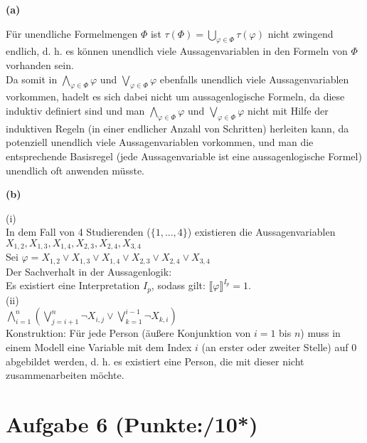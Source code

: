 \documentclass[11pt, a4paper]{article}
\newcommand{\pppp}{10*}
\begin{document}
\textbf{(a)}
\begin{adjustwidth}{20pt}{20pt}
Für unendliche Formelmengen $\Phi$ ist $\tau(\Phi)=\bigcup\limits_{\varphi \in \Phi} \tau(\varphi)$ nicht zwingend endlich, d. h. es können unendlich viele Aussagenvariablen in den Formeln von $\Phi$ vorhanden sein.\\

Da somit in $\bigwedge\limits_{\varphi \in \Phi} \varphi$ und $\bigvee\limits_{\varphi \in \Phi} \varphi$ ebenfalls unendlich viele Aussagenvariablen vorkommen, hadelt es sich dabei nicht um aussagenlogische Formeln, da diese induktiv definiert sind und man $\bigwedge\limits_{\varphi \in \Phi} \varphi$ und $\bigvee\limits_{\varphi \in \Phi} \varphi$ nicht mit Hilfe der induktiven Regeln (in einer endlicher Anzahl von Schritten) herleiten kann, da potenziell unendlich viele Aussagenvariablen vorkommen, und man die entsprechende Basisregel (jede Aussagenvariable ist eine aussagenlogische Formel) unendlich oft anwenden müsste.

\end{adjustwidth}
\textbf{(b)}
\begin{adjustwidth}{20pt}{20pt}
(i)\\
In dem Fall von 4 Studierenden ($\{1,...,4\}$) existieren die Aussagenvariablen $X_{1,2},X_{1,3},X_{1,4},X_{2,3},X_{2,4},X_{3,4}$\\
Sei $\varphi=X_{1,2} \vee X_{1,3} \vee X_{1,4} \vee X_{2,3} \vee X_{2,4} \vee X_{3,4}$\\
Der Sachverhalt in der Aussagenlogik:\\
Es existiert eine Interpretation $I_p$, sodass gilt: $\llbracket \varphi \rrbracket^{I_p}=1$.\\
(ii)\\

 $\bigwedge\limits_{i=1}^n \left(\bigvee\limits_{j=i+1}^n \neg X_{i,j} \vee \bigvee\limits_{k=1}^{i-1} \neg X_{k,i} \right)$\\
 
 Konstruktion: Für jede Person (äußere Konjunktion von $i=1$ bis $n$) muss in einem Modell eine Variable mit dem Index $i$ (an erster oder zweiter Stelle) auf $0$ abgebildet werden, d. h. es existiert eine Person, die mit dieser nicht zusammenarbeiten möchte.
\end{adjustwidth}

\section*{Aufgabe 6 (Punkte:\qquad/\pppp)}
\end{document}
